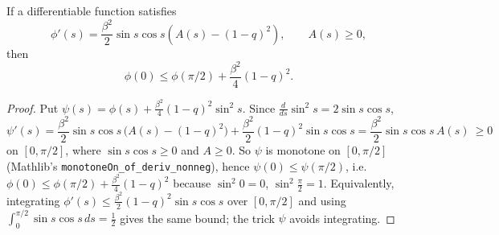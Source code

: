 \begin{lemma}
  \label{lem:sg-tal:trig-rs-endpoint}
  \leanok
{}
If a differentiable function satisfies
\[
\phi'(s)=\frac{\beta^2}{2}\sin s\cos s
  \left(A(s)-(1-q)^2\right), \qquad A(s)\geq 0,
\]
then
\[
\phi(0)\leq \phi(\pi/2)+\frac{\beta^2}{4}(1-q)^2.
\]
\end{lemma}
\begin{proof}
  \leanok
Put $\psi(s)=\phi(s)+\frac{\beta^2}{4}(1-q)^2\sin^2 s$. Since $\frac{d}{ds}\sin^2 s=2\sin s\cos s$,
\[
\psi'(s)=\frac{\beta^2}{2}\sin s\cos s\,\big(A(s)-(1-q)^2\big)+\frac{\beta^2}{2}(1-q)^2\sin s\cos s
=\frac{\beta^2}{2}\sin s\cos s\,A(s)\ \ge 0
\]
on $[0,\pi/2]$, where $\sin s\cos s\ge0$ and $A\ge0$. So $\psi$ is monotone on $[0,\pi/2]$ (Mathlib's \texttt{monotoneOn\_of\_deriv\_nonneg}), hence $\psi(0)\le\psi(\pi/2)$, i.e.\ $\phi(0)\le\phi(\pi/2)+\frac{\beta^2}{4}(1-q)^2$ because $\sin^2 0=0$, $\sin^2\frac\pi2=1$.
Equivalently, integrating $\phi'(s)\le\frac{\beta^2}{2}(1-q)^2\sin s\cos s$ over $[0,\pi/2]$ and using $\int_0^{\pi/2}\sin s\cos s\,ds=\frac12$ gives the same bound; the trick $\psi$ avoids integrating.
\end{proof}


